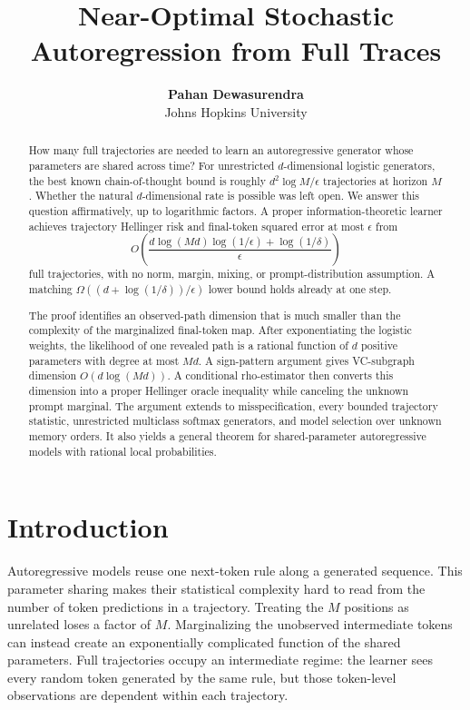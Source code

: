\documentclass{article}
\title{Near-Optimal Stochastic Autoregression from Full Traces}
\author{\textbf{Pahan Dewasurendra} \\ Johns Hopkins University}
\theoremstyle{definition}
\theoremstyle{remark}
\begin{document}
\maketitle

\begin{abstract}
How many full trajectories are needed to learn an autoregressive generator whose parameters are shared across time? For unrestricted $d$-dimensional logistic generators, the best known chain-of-thought bound is roughly $d^2\log M/\epsilon$ trajectories at horizon $M$. Whether the natural $d$-dimensional rate is possible was left open. We answer this question affirmatively, up to logarithmic factors. A proper information-theoretic learner achieves trajectory Hellinger risk and final-token squared error at most $\epsilon$ from \[ O\!\left(\frac{d\log(Md)\log(1/\epsilon)+\log(1/\delta)}{\epsilon}\right) \] full trajectories, with no norm, margin, mixing, or prompt-distribution assumption. A matching $\Omega((d+\log(1/\delta))/\epsilon)$ lower bound holds already at one step.

The proof identifies an observed-path dimension that is much smaller than the complexity of the marginalized final-token map. After exponentiating the logistic weights, the likelihood of one revealed path is a rational function of $d$ positive parameters with degree at most $Md$. A sign-pattern argument gives VC-subgraph dimension $O(d\log(Md))$. A conditional rho-estimator then converts this dimension into a proper Hellinger oracle inequality while canceling the unknown prompt marginal. The argument extends to misspecification, every bounded trajectory statistic, unrestricted multiclass softmax generators, and model selection over unknown memory orders. It also yields a general theorem for shared-parameter autoregressive models with rational local probabilities.
\end{abstract}

\section{Introduction}

Autoregressive models reuse one next-token rule along a generated sequence. This parameter sharing makes their statistical complexity hard to read from the number of token predictions in a trajectory. Treating the $M$ positions as unrelated loses a factor of $M$. Marginalizing the unobserved intermediate tokens can instead create an exponentially complicated function of the shared parameters. Full trajectories occupy an intermediate regime: the learner sees every random token generated by the same rule, but those token-level observations are dependent within each trajectory.
\end{document}
